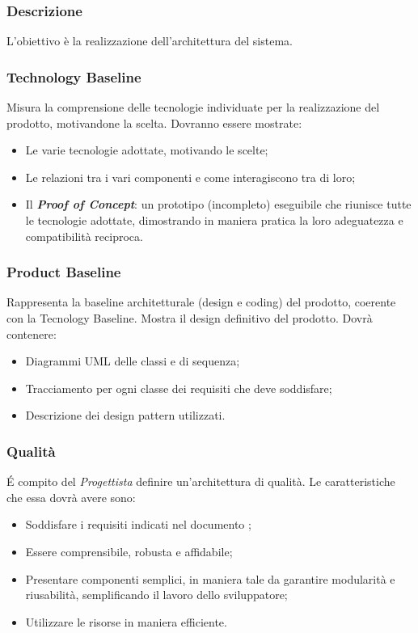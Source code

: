 \subsubsection{Descrizione}
L’obiettivo è la realizzazione dell’architettura del sistema.

\subsubsection{Technology Baseline}
Misura la comprensione delle tecnologie individuate per la realizzazione del prodotto, motivandone la scelta. 
Dovranno essere mostrate:
\begin{itemize}
	\item Le varie tecnologie adottate, motivando le scelte;
	\item Le relazioni tra i vari componenti e come interagiscono tra di loro;
	\item Il \textit{\textbf{Proof of Concept}}: un prototipo (incompleto) eseguibile che riunisce tutte le tecnologie adottate, dimostrando in maniera pratica la loro adeguatezza e compatibilità reciproca. 
\end{itemize}

\subsubsection{Product Baseline}
Rappresenta la baseline architetturale (design e coding) del prodotto, coerente con la Tecnology Baseline. Mostra il design definitivo del prodotto.
Dovrà contenere:
\begin{itemize}
	\item Diagrammi UML delle classi e di sequenza;
	\item Tracciamento per ogni classe dei requisiti che deve soddisfare;
	\item Descrizione dei design pattern utilizzati.
\end{itemize}

\subsubsection{Qualità}
\'E compito del \textit{Progettista} definire un'architettura di qualità. Le caratteristiche che essa dovrà avere sono:
\begin{itemize}
  \item Soddisfare i requisiti indicati nel documento \AdR;
  \item Essere comprensibile, robusta e affidabile;
  \item Presentare componenti semplici, in maniera tale da garantire modularità e riusabilità, semplificando il lavoro dello sviluppatore;
  \item Utilizzare le risorse in maniera efficiente.
\end{itemize}

